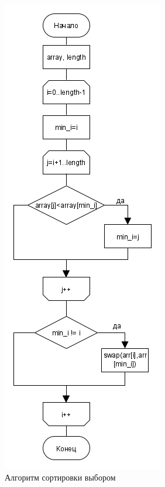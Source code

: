 \begin{figure}[H]
	\centering
	\includegraphics[height=0.8\textheight]{src/selectionSort}
	\caption{Алгоритм сортировки выбором}
	\label{fig:selectionnsort}
\end{figure}
